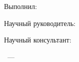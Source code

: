 \begin{flushright}%

Выполнил:

\MeFio
\end{flushright}%

\begin{flushright}%
Научный руководитель:

\supervisorRegalia

\supervisorFio
\end{flushright}%

\begin{flushright}%
Научный консультант:

\supervisorRegalia

\supervisorFioAlex
\end{flushright}%



%
\vspace{0pt plus4fill} %
\begin{center}%
{\thesisCity~--- \thesisYear}
\end{center}%
\newpage
